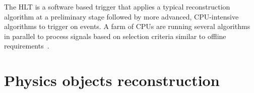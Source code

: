 The HLT is a software based trigger that applies a typical reconstruction algorithm at a preliminary stage 
followed by more advanced, CPU-intensive algorithms to trigger on events. A farm of CPUs are running several
algorithms in parallel to process signals based on selection criteria similar to offline requirements~\cite{C-Gabaldon_2012}.   

\section{Physics objects reconstruction}